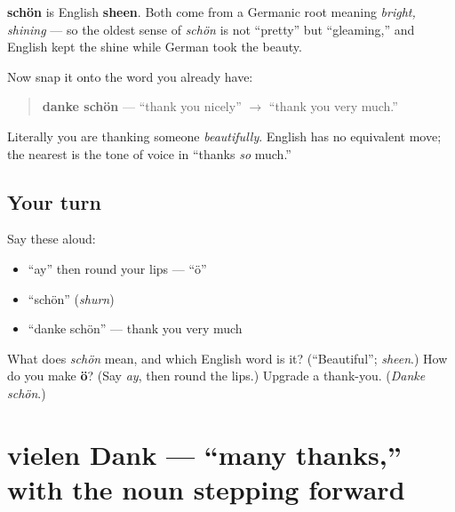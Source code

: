 \begin{cousinweb}
\textbf{schön} is English \textbf{sheen}. Both come from a Germanic root meaning \emph{bright, shining} — so the oldest sense of \emph{schön} is not \textquotedblleft{}pretty\textquotedblright{} but \textquotedblleft{}gleaming,\textquotedblright{} and English kept the shine while German took the beauty.

Now snap it onto the word you already have:

\begin{quote}
\textbf{danke schön} — \textquotedblleft{}thank you nicely\textquotedblright{} $\to$ \textquotedblleft{}thank you very much.\textquotedblright{}
\end{quote}

Literally you are thanking someone \emph{beautifully}. English has no equivalent move; the nearest is the tone of voice in \textquotedblleft{}thanks \emph{so} much.\textquotedblright{}
\end{cousinweb}

\subsection*{Your turn}
Say these aloud:

\begin{itemize}
\raggedright
  \item \textquotedblleft{}ay\textquotedblright{} then round your lips — \textquotedblleft{}ö\textquotedblright{}
  \item \textquotedblleft{}schön\textquotedblright{} (\emph{shurn})
  \item \textquotedblleft{}danke schön\textquotedblright{} — thank you very much
\end{itemize}

\begin{tcolorbox}[breakable,colback=teal!4,colframe=teal!35!black,title={Before you move on}]
What does \emph{schön} mean, and which English word is it? (\textquotedblleft{}Beautiful\textquotedblright{}; \emph{sheen}.) How do you make \textbf{ö}? (Say \emph{ay}, then round the lips.) Upgrade a thank-you. (\emph{Danke schön}.)
\end{tcolorbox}
\section[vielen Dank]{vielen Dank — \textquotedblleft{}many thanks,\textquotedblright{} with the noun stepping forward}

\label{lesson:GE-C03-vielen-dank}



